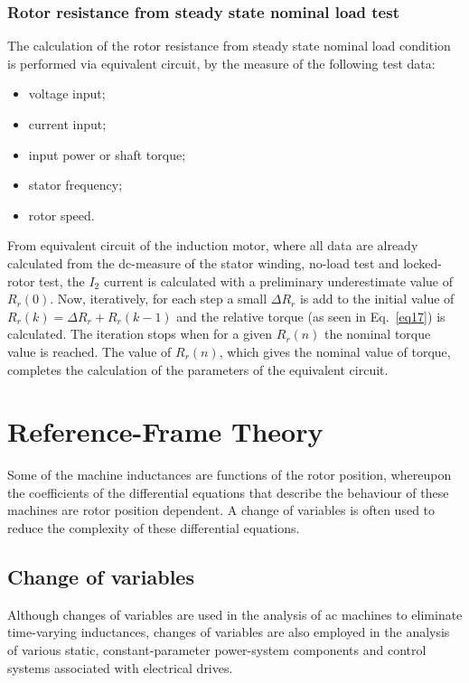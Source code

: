 \documentclass[11pt,a4paper,oneside]{book}
\numberwithin{equation}{section}
\theoremstyle{it}
\theoremstyle{definition}
\begin{document}
\subsection{Rotor resistance from steady state nominal load test}
The calculation of the rotor resistance from steady state nominal load condition is performed via equivalent circuit, by the measure of the following test data:
\begin{itemize}
	\item voltage input;
	\item current input;
	\item input power or shaft torque;
	\item stator frequency;
	\item rotor speed.
\end{itemize}
From equivalent circuit of the induction motor, where all data are already calculated from the dc-measure of the stator winding, no-load test and locked-rotor test, the $I_2$ current is calculated with a preliminary underestimate value of $R_r(0)$. Now, iteratively, for each step a small $\Delta R_r$ is add to the initial value of $R_r(k)=\Delta R_r+R_r(k-1)$ and the relative torque (as seen in Eq.~\eqref{eq17}) is calculated. The iteration stops when for a given $R_r(n)$ the nominal torque value is reached. The value of $R_r(n)$, which gives the nominal value of torque, completes the calculation of the parameters of the equivalent circuit.

\chapter{Reference-Frame Theory}
Some of the machine inductances are functions of the rotor position, whereupon the coefficients of the differential equations that describe the behaviour of these machines are rotor position dependent. A change of variables is often used to reduce the complexity of these differential equations.

\section{Change of variables}
Although changes of variables are used in the analysis of ac machines to eliminate time-varying inductances, changes of variables are also employed in the analysis of various static, constant-parameter power-system components and control systems associated with electrical drives.
\end{document}
